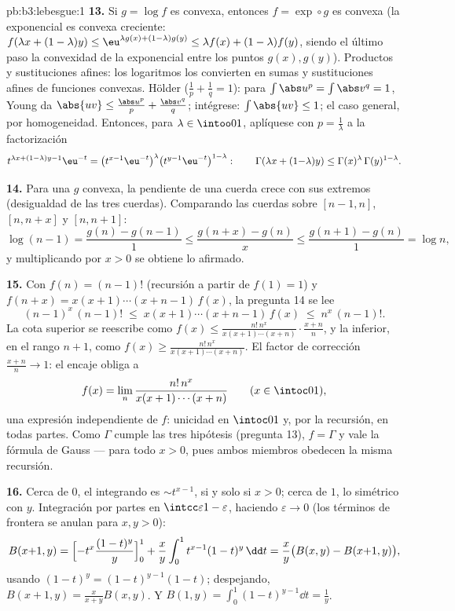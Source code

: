 \begin{solution}{pb:b3:lebesgue:1}
\textbf{13.} Si $g = \log f$ es convexa, entonces $f = \exp\circ g$ es
convexa (la exponencial es convexa creciente: $f(\lambda x + (1-\lambda)
y) \leq \eu^{\lambda g(x) + (1-\lambda)g(y)} \leq \lambda f(x)
+ (1-\lambda)f(y)$, siendo el último paso la convexidad de la
exponencial entre los puntos $g(x), g(y)$). Productos y sustituciones
afines: los logaritmos los convierten en sumas y sustituciones afines de
funciones convexas. Hölder ($\frac1p + \frac1q = 1$): para
$\int\abs u^p = \int\abs v^q = 1$, Young da $\abs{uv} \leq
\frac{\abs u^p}p + \frac{\abs v^q}q$; intégrese: $\int\abs{uv}
\leq 1$; el caso general, por homogeneidad. Entonces, para $\lambda
\in \intoo01$, aplíquese con $p = \frac1\lambda$ a la factorización
\[
t^{\lambda x + (1-\lambda)y - 1}\eu^{-t}
= \bigl(t^{x-1}\eu^{-t}\bigr)^{\lambda}
\bigl(t^{y-1}\eu^{-t}\bigr)^{1-\lambda} :
\qquad
\Gamma(\lambda x + (1{-}\lambda)y) \leq
\Gamma(x)^\lambda\,\Gamma(y)^{1-\lambda} .
\]

\textbf{14.} Para una $g$ convexa, la pendiente de una cuerda crece con
sus extremos (desigualdad de las tres cuerdas). Comparando las cuerdas
sobre $[n-1, n]$, $[n, n+x]$ y $[n, n+1]$:
\[
\log(n-1) = \frac{g(n) - g(n-1)}1 \leq
\frac{g(n+x) - g(n)}x \leq \frac{g(n+1) - g(n)}1 = \log n,
\]
y multiplicando por $x > 0$ se obtiene lo afirmado.

\textbf{15.} Con $f(n) = (n-1)!$ (recursión a partir de $f(1) = 1$) y
$f(n + x) = x(x+1)\cdots(x+n-1)\,f(x)$, la pregunta 14 se lee
\[
(n-1)^x\,(n-1)! \;\leq\; x(x+1)\cdots(x+n-1)\,f(x)
\;\leq\; n^x\,(n-1)! .
\]
La cota superior se reescribe como $f(x) \leq
\frac{n!\,n^x}{x(x+1)\cdots(x+n)}\cdot\frac{x+n}n$, y la inferior, en el
rango $n+1$, como $f(x) \geq
\frac{n!\,n^x}{x(x+1)\cdots(x+n)}$. El factor de corrección
$\frac{x+n}n \to 1$: el encaje obliga a
\[
f(x) = \lim_n\frac{n!\,n^x}{x(x+1)\cdots(x+n)}
\qquad (x \in \intoc01),
\]
una expresión independiente de $f$: unicidad en $\intoc01$ y, por la
recursión, en todas partes. Como $\Gamma$ cumple las tres hipótesis
(pregunta 13), $f = \Gamma$ y vale la fórmula de Gauss --- para todo
$x > 0$, pues ambos miembros obedecen la misma recursión.

\textbf{16.} Cerca de $0$, el integrando es $\sim t^{x-1}$,
 si y solo si $x > 0$; cerca de
$1$, lo simétrico con $y$. Integración por partes en
$\intcc\varepsilon{1-\varepsilon}$, haciendo $\varepsilon \to 0$ (los
términos de frontera se anulan para $x, y >
0$):
\[
B(x{+}1, y) = \Bigl[-t^x\frac{(1-t)^y}y\Bigr]_0^1 +
\frac xy\int_0^1t^{x-1}(1-t)^y\,\dd t
= \frac xy\bigl(B(x, y) - B(x{+}1, y)\bigr),
\]
usando $(1-t)^y = (1-t)^{y-1}(1 - t)$; despejando, $B(x+1, y) =
\frac{x}{x+y}B(x, y)$. Y $B(1, y) =
\int_0^1(1-t)^{y-1}\dd t = \frac1y$.


\end{solution}
